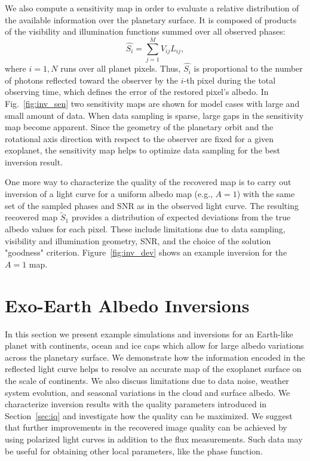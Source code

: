 \documentclass{emulateapj}
\begin{document}
We also compute a sensitivity map in order to evaluate a relative distribution 
of the available information over the planetary surface. It is composed of products 
of the visibility and illumination functions summed over all observed phases:
\begin{equation}
\hat{S_{i}}=\sum_{j=1}^{M} V_{ij} L_{ij} ,
\label{eq:sen}
\end{equation}
where $i=1,N$ runs over all planet pixels.
Thus, $\hat{S_{i}}$ is proportional to the number of photons reflected toward
the observer by the $i$-th pixel during the total observing time, which defines
the error of the restored pixel's albedo. In Fig.~\ref{fig:inv_sen} two
sensitivity maps are shown for model cases with large and small amount of data.
When data sampling is sparse, large gaps in the sensitivity map become apparent.
Since the geometry of the planetary orbit and the rotational axis direction
with respect to the observer
are fixed for a given exoplanet, the sensitivity map helps to optimize
data sampling for the best inversion result. 

One more way to characterize the quality of the recovered map is to
carry out inversion of a light curve for a uniform albedo map (e.g., $A=1$) 
with the same set of the sampled phases and SNR as in the observed light curve. 
The resulting recovered map $\tilde{S}_1$ provides a distribution of expected 
deviations from the true albedo values for each pixel. These include limitations
due to data sampling, visibility and illumination geometry, SNR, and the choice
of the solution "goodness" criterion. Figure~\ref{fig:inv_dev} shows an example
inversion for the $A=1$ map.

\section{Exo-Earth Albedo Inversions}\label{sec:sim}

In this section we present example simulations and inversions for 
an Earth-like planet with continents, ocean and ice caps which allow
for large albedo variations across the planetary surface.
We demonstrate how the information encoded in the reflected light curve 
helps to resolve an accurate map of the exoplanet surface on the scale of continents.
We also discuss limitations due to data noise, weather system evolution,
and seasonal variations in the cloud and surface albedo. 
We characterize inversion results with 
the quality parameters introduced in Section~\ref{sec:iq} and investigate how the quality 
can be maximized. 
We suggest that further improvements in the recovered image quality 
can be achieved by using polarized light curves in addition to the flux
measurements. Such data may be useful for obtaining other local parameters,
like the phase function.
\end{document}
